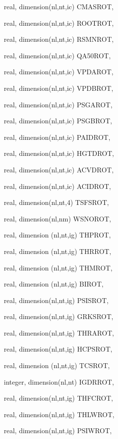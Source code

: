 {\begin{DoxyParamCaption}
\item[{real, dimension(nl,nt,ic)}]{C\+M\+A\+S\+R\+O\+T, }
\item[{real, dimension(nl,nt,ic)}]{R\+O\+O\+T\+R\+O\+T, }
\item[{real, dimension(nl,nt,ic)}]{R\+S\+M\+N\+R\+O\+T, }
\item[{real, dimension(nl,nt,ic)}]{Q\+A50\+R\+O\+T, }
\item[{real, dimension(nl,nt,ic)}]{V\+P\+D\+A\+R\+O\+T, }
\item[{real, dimension(nl,nt,ic)}]{V\+P\+D\+B\+R\+O\+T, }
\item[{real, dimension(nl,nt,ic)}]{P\+S\+G\+A\+R\+O\+T, }
\item[{real, dimension(nl,nt,ic)}]{P\+S\+G\+B\+R\+O\+T, }
\item[{real, dimension(nl,nt,ic)}]{P\+A\+I\+D\+R\+O\+T, }
\item[{real, dimension(nl,nt,ic)}]{H\+G\+T\+D\+R\+O\+T, }
\item[{real, dimension(nl,nt,ic)}]{A\+C\+V\+D\+R\+O\+T, }
\item[{real, dimension(nl,nt,ic)}]{A\+C\+I\+D\+R\+O\+T, }
\item[{real, dimension(nl,nt,4)}]{T\+S\+F\+S\+R\+O\+T, }
\item[{real, dimension(nl,nm)}]{W\+S\+N\+O\+R\+O\+T, }
\item[{real, dimension (nl,nt,ig)}]{T\+H\+P\+R\+O\+T, }
\item[{real, dimension (nl,nt,ig)}]{T\+H\+R\+R\+O\+T, }
\item[{real, dimension (nl,nt,ig)}]{T\+H\+M\+R\+O\+T, }
\item[{real, dimension  (nl,nt,ig)}]{B\+I\+R\+O\+T, }
\item[{real, dimension(nl,nt,ig)}]{P\+S\+I\+S\+R\+O\+T, }
\item[{real, dimension(nl,nt,ig)}]{G\+R\+K\+S\+R\+O\+T, }
\item[{real, dimension(nl,nt,ig)}]{T\+H\+R\+A\+R\+O\+T, }
\item[{real, dimension(nl,nt,ig)}]{H\+C\+P\+S\+R\+O\+T, }
\item[{real, dimension (nl,nt,ig)}]{T\+C\+S\+R\+O\+T, }
\item[{integer, dimension(nl,nt)}]{I\+G\+D\+R\+R\+O\+T, }
\item[{real, dimension(nl,nt,ig)}]{T\+H\+F\+C\+R\+O\+T, }
\item[{real, dimension(nl,nt,ig)}]{T\+H\+L\+W\+R\+O\+T, }
\item[{real, dimension(nl,nt,ig)}]{P\+S\+I\+W\+R\+O\+T, }

\end{DoxyParamCaption}}
